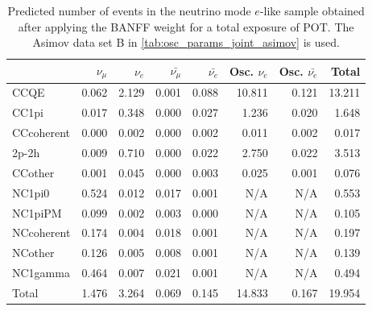 
\begin{table}
\center
\begin{tabular} { | l ||r | r | r | r | r | r | | r | }
\hline
              & $\nu_\mu$            & $\nu_e$              & $\bar{\nu_\mu}$      & $\bar{\nu_e}$        & Osc. $\nu_e$         & Osc. $\bar{\nu_e}$   & Total                \\ \hline\hline
 CCQE         & 0.062                & 2.129                & 0.001                & 0.088                & 10.811               & 0.121                & 13.211               \\ \hline
 CC1pi        & 0.017                & 0.348                & 0.000                & 0.027                & 1.236                & 0.020                & 1.648                \\ \hline
 CCcoherent   & 0.000                & 0.002                & 0.000                & 0.002                & 0.011                & 0.002                & 0.017                \\ \hline
 2p-2h          & 0.009                & 0.710                & 0.000                & 0.022                & 2.750                & 0.022                & 3.513                \\ \hline
 CCother      & 0.001                & 0.045                & 0.000                & 0.003                & 0.025                & 0.001                & 0.076                \\ \hline
 NC1pi0       & 0.524                & 0.012                & 0.017                & 0.001                & N/A                  & N/A                  & 0.553                \\ \hline
 NC1piPM      & 0.099                & 0.002                & 0.003                & 0.000                & N/A                  & N/A                  & 0.105                \\ \hline
 NCcoherent   & 0.174                & 0.004                & 0.018                & 0.001                & N/A                  & N/A                  & 0.197                \\ \hline
 NCother      & 0.126                & 0.005                & 0.008                & 0.001                & N/A                  & N/A                  & 0.139                \\ \hline
 NC1gamma     & 0.464                & 0.007                & 0.021                & 0.001                & N/A                  & N/A                  & 0.494                \\ \hline
\hline
 Total        & 1.476                & 3.264                & 0.069                & 0.145                & 14.833               & 0.167                & 19.954               \\ \hline

\end{tabular}
\caption{
Predicted number of events in the neutrino mode $e$-like sample
obtained after applying the BANFF weight
for a total exposure of \TotalPotNu{} POT.
The Asimov data set B in \cref{tab:osc_params_joint_asimov} is used.
}
\label{tab:events_1re_Asimov_B}
\end{table}


